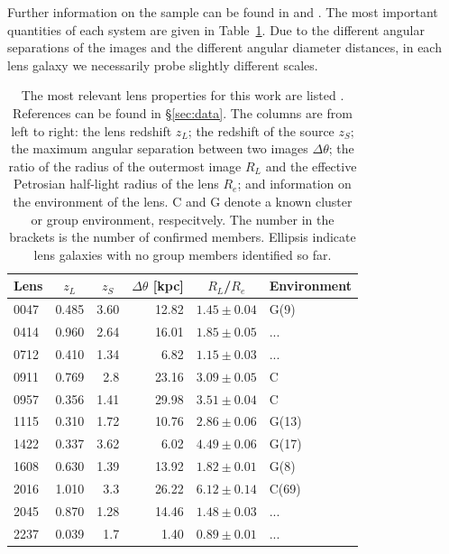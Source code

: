 \documentclass[useAMS,usenatbib]{mn2e}
\begin{document}
Further information on the sample can be found in \citet{2011ApJ...740...97L} and \citet{2012A&A...538A..99S}. The most important quantities of each system are given in Table~\ref{tab:lensproperties}. Due to the different angular separations of the images and the different angular diameter distances, in each lens galaxy we necessarily probe slightly different scales.

\begin{table}
  \begin{center}
    \begin{tabular}{l r r r r l}
      Lens    & \multicolumn{1}{c}{$z_{L}$} & \multicolumn{1}{c}{$z_{S}$} & \multicolumn{1}{c}{$\Delta\theta$ [kpc]} & \multicolumn{1}{c}{$R_{L}$/$R_{e}$} & Environment \\ \hline
      0047 & 0.485 & 3.60 & 12.82 & $1.45\pm0.04$ & G(9) \\
      0414 & 0.960 & 2.64 & 16.01 & $1.85\pm0.05$ & ... \\
      0712 & 0.410 & 1.34 & 6.82  & $1.15\pm0.03$ & ... \\
      0911 & 0.769 & 2.8  & 23.16 & $3.09\pm0.05$ & C \\
      0957 & 0.356 & 1.41 & 29.98 & $3.51\pm0.04$ & C \\
      1115 & 0.310 & 1.72 & 10.76 & $2.86\pm0.06$ & G(13) \\
      1422 & 0.337 & 3.62 & 6.02  & $4.49\pm0.06$ & G(17) \\
      1608 & 0.630 & 1.39 & 13.92 & $1.82\pm0.01$ & G(8) \\
      2016 & 1.010 & 3.3  & 26.22 & $6.12\pm0.14$ & C(69) \\
      2045 & 0.870 & 1.28 & 14.46 & $1.48\pm0.03$ & ... \\
      2237 & 0.039 & 1.7  & 1.40  & $0.89\pm0.01$ & ... \\
    \end{tabular}
    \caption[width=\linewidth]{The most relevant lens properties for this work are listed \citep[for an expanded version of this table see][]{2011ApJ...740...97L}. References can be found in \S\ref{sec:data}. The columns are from left to right: the lens redshift $z_L$; the redshift of the source $z_S$; the maximum angular separation between two images $\Delta\theta$; the ratio of the radius of the outermost image $R_L$ and the effective Petrosian half-light radius of the lens $R_e$; and information on the environment of the lens. C and G denote a known cluster or group environment, respecitvely. The number in the brackets is the number of confirmed members. Ellipsis indicate lens galaxies with no group members identified so far.}
    \label{tab:lensproperties}
  \end{center}
\end{table}
\end{document}
